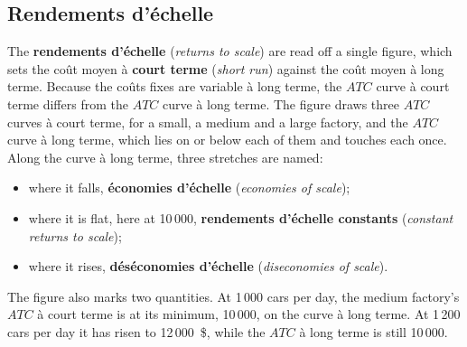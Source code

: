 \subsection{Rendements d'échelle}

The \textbf{rendements d'échelle} (\textit{returns to scale}) are read off a single
figure, which sets the coût moyen à \textbf{court terme} (\textit{short run})
against the coût moyen à long terme. Because the coûts fixes are variable à long
terme, the $ATC$ curve à court terme differs from the $ATC$ curve à long terme. The
figure draws three $ATC$ curves à court terme, for a small, a medium and a large
factory, and the $ATC$ curve à long terme, which lies on or below each of them and
touches each once. Along the curve à long terme, three stretches are named:
\begin{itemize}
  \item where it falls, \textbf{économies d'échelle} (\textit{economies of scale});
  \item where it is flat, here at 10\,000, \textbf{rendements d'échelle constants}
    (\textit{constant returns to scale});
  \item where it rises, \textbf{déséconomies d'échelle}
    (\textit{diseconomies of scale}).
\end{itemize}
The figure also marks two quantities. At 1\,000 cars per day, the medium
factory's $ATC$ à court terme is at its minimum, 10\,000, on the curve à long terme.
At 1\,200 cars per day it has risen to 12\,000~\$, while the $ATC$ à long terme
is still 10\,000.

